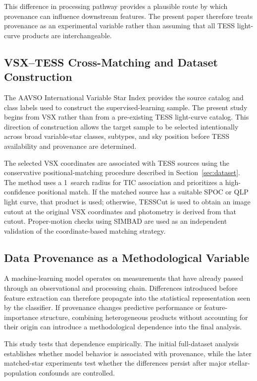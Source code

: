 \documentclass[linenumbers]{aastex701}
\begin{document}
This difference in processing pathway provides a plausible route by which provenance can influence downstream features. The present paper therefore treats provenance as an experimental variable rather than assuming that all TESS light-curve products are interchangeable.


\subsection{VSX--TESS Cross-Matching and Dataset Construction}
The AAVSO International Variable Star Index provides the source catalog and class labels used to construct the supervised-learning sample. The present study begins from VSX rather than from a pre-existing TESS light-curve catalog. This direction of construction allows the target sample to be selected intentionally across broad variable-star classes, subtypes, and sky position before TESS availability and provenance are determined.

The selected VSX coordinates are associated with TESS sources using the conservative positional-matching procedure described in Section~\ref{sec:dataset}. The method uses a 1\arcsec\ search radius for TIC association and prioritizes a high-confidence positional match. If the matched source has a suitable SPOC or QLP light curve, that product is used; otherwise, TESSCut is used to obtain an image cutout at the original VSX coordinates and photometry is derived from that cutout. Proper-motion checks using SIMBAD are used as an independent validation of the coordinate-based matching strategy.


\subsection{Data Provenance as a Methodological Variable}
A machine-learning model operates on measurements that have already passed through an observational and processing chain. Differences introduced before feature extraction can therefore propagate into the statistical representation seen by the classifier. If provenance changes predictive performance or feature-importance structure, combining heterogeneous products without accounting for their origin can introduce a methodological dependence into the final analysis.

This study tests that dependence empirically. The initial full-dataset analysis establishes whether model behavior is associated with provenance, while the later matched-star experiments test whether the differences persist after major stellar-population confounds are controlled.
\end{document}
